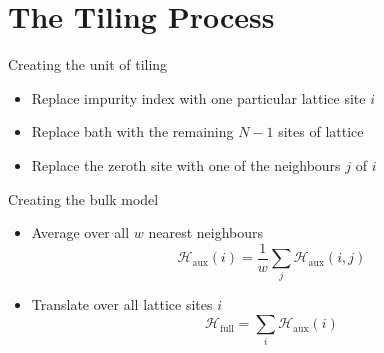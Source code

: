 \documentclass[aspectratio=169]{beamer}
\begin{document}
\section{The Tiling Process}
\label{tiling}

\begin{frame}[noframenumbering]{Creating the unit of tiling}
\begin{itemize}[<+->]
\item Replace impurity index with one particular lattice site \(i\)
\item Replace bath with the remaining \(N-1\) sites of lattice
\item Replace the zeroth site with one of the neighbours \(j\) of \(i\)
\end{itemize}
\end{frame}

\begin{frame}[noframenumbering]{Creating the bulk model}
\begin{itemize}[<+->]
	\item Average over all \(w\) nearest neighbours
		\[\mathcal{H}_\text{aux}(i) = \frac{1}{w}\sum_j \mathcal{H}_\text{aux}(i,j)\]
	\item Translate over all lattice sites \(i\)
		\[\mathcal{H}_\text{full} = \sum_i \mathcal{H}_\text{aux}(i)\]
\end{itemize}
\vspace*{-10pt}
\end{frame}
\end{document}
